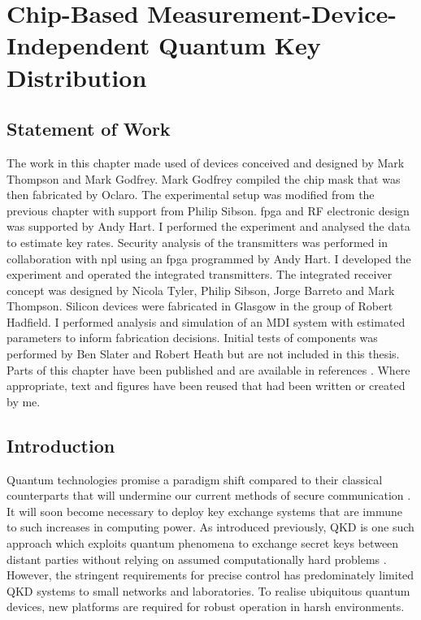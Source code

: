 %
%
\graphicspath{{./chapters/chapter04/fig04/}}

\let\textcircled=\pgftextcircled
\chapter[Chip-Based Measurement-Device-Independent QKD]{Chip-Based Measurement-Device-Independent Quantum Key Distribution}
\label{chap:mdiqkd}

\section*{Statement of Work}

The work in this chapter made used of devices conceived and designed by Mark Thompson and Mark Godfrey. Mark Godfrey compiled the chip mask that was then fabricated by Oclaro. The experimental setup was modified from the previous chapter with support from Philip Sibson. \Acs{fpga} and RF electronic design was supported by Andy Hart. I performed the experiment and analysed the data to estimate key rates. Security analysis of the transmitters was performed in collaboration with \acl{npl} using an \acs{fpga} programmed by Andy Hart. I developed the experiment and operated the integrated transmitters. The integrated receiver concept was designed by Nicola Tyler, Philip Sibson, Jorge Barreto and Mark Thompson. Silicon devices were fabricated in Glasgow in the group of Robert Hadfield. I performed analysis and simulation of an \acl{MDI} system with estimated parameters to inform fabrication decisions. Initial tests of components was performed by Ben Slater and Robert Heath but are not included in this thesis. Parts of this chapter have been published and are available in references \cite{semenenko2019mdi, semenenko2019integrated, vaquero2018}. Where appropriate, text and figures have been reused that had been written or created by me.

\section{Introduction}

Quantum technologies promise a paradigm shift compared to their classical counterparts that will undermine our current methods of secure communication \cite{shor1994}. It will soon become necessary to deploy key exchange systems that are immune to such increases in computing power. As introduced previously, \ac{QKD} is one such approach which exploits quantum phenomena to exchange secret keys between distant parties without relying on assumed computationally hard problems \cite{BB84, E91}. However, the stringent requirements for precise control has predominately limited \ac{QKD} systems to small networks and laboratories. To realise ubiquitous quantum devices, new platforms are required for robust operation in harsh environments. 

